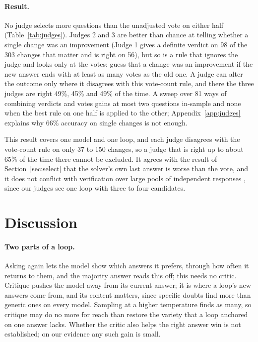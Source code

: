 \documentclass[11pt]{article}
\begin{document}
\paragraph{Result.}
No judge selects more questions than the unadjusted vote on either half (Table~\ref{tab:judges}).
Judges 2 and 3 are better than chance at telling whether a single change was an improvement (Judge 1 gives a definite verdict on 98 of the 303 changes that matter and is right on 56), but so is a rule that ignores the judge and looks only at the votes: guess that a change was an improvement if the new answer ends with at least as many votes as the old one.
A judge can alter the outcome only where it disagrees with this vote-count rule, and there the three judges are right 49\%, 45\% and 49\% of the time.
A sweep over 81 ways of combining verdicts and votes gains at most two questions in-sample and none when the best rule on one half is applied to the other; Appendix~\ref{app:judges} explains why 66\% accuracy on single changes is not enough.

This result covers one model and one loop, and each judge disagrees with the vote-count rule on only 37 to 150 changes, so a judge that is right up to about 65\% of the time there cannot be excluded.
It agrees with the result of Section~\ref{sec:select} that the solver's own last answer is worse than the vote, and it does not conflict with verification over large pools of independent responses \citep{zhao2025sample}, since our judges see one loop with three to four candidates.

\section{Discussion}

\paragraph{Two parts of a loop.}
Asking again lets the model show which answers it prefers, through how often it returns to them, and the majority answer reads this off; this needs no critic.
Critique pushes the model away from its current answer; it is where a loop's new answers come from, and its content matters, since specific doubts find more than generic ones on every model.
Sampling at a higher temperature finds as many, so critique may do no more for reach than restore the variety that a loop anchored on one answer lacks.
Whether the critic also helps the right answer win is not established; on our evidence any such gain is small.
\end{document}

